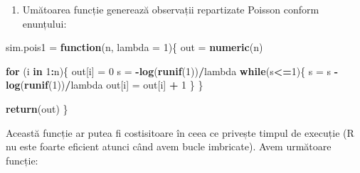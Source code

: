 \documentclass[]{article}
\newenvironment{Shaded}{\begin{snugshade}}{\end{snugshade}}
\newcommand{\ControlFlowTok}[1]{\textcolor[rgb]{0.13,0.29,0.53}{\textbf{#1}}}
\newcommand{\DataTypeTok}[1]{\textcolor[rgb]{0.13,0.29,0.53}{#1}}
\newcommand{\DecValTok}[1]{\textcolor[rgb]{0.00,0.00,0.81}{#1}}
\newcommand{\KeywordTok}[1]{\textcolor[rgb]{0.13,0.29,0.53}{\textbf{#1}}}
\newcommand{\NormalTok}[1]{#1}
\newcommand{\OperatorTok}[1]{\textcolor[rgb]{0.81,0.36,0.00}{\textbf{#1}}}
\newcommand{\StringTok}[1]{\textcolor[rgb]{0.31,0.60,0.02}{#1}}
\providecommand{\tightlist}{%
  \setlength{\itemsep}{0pt}\setlength{\parskip}{0pt}}
\begin{document}
\begin{enumerate}
\def\labelenumi{\arabic{enumi}.}
\setcounter{enumi}{2}
\tightlist
\item
  Umătoarea funcție generează observații repartizate Poisson conform
  enunțului:
\end{enumerate}

\begin{Shaded}
\begin{Highlighting}[]
\NormalTok{sim.pois1 =}\StringTok{ }\ControlFlowTok{function}\NormalTok{(n, }\DataTypeTok{lambda =} \DecValTok{1}\NormalTok{)\{}
\NormalTok{  out =}\StringTok{ }\KeywordTok{numeric}\NormalTok{(n)}
  
  \ControlFlowTok{for}\NormalTok{ (i }\ControlFlowTok{in} \DecValTok{1}\OperatorTok{:}\NormalTok{n)\{}
\NormalTok{    out[i] =}\StringTok{ }\DecValTok{0}
\NormalTok{    s =}\StringTok{ }\OperatorTok{-}\KeywordTok{log}\NormalTok{(}\KeywordTok{runif}\NormalTok{(}\DecValTok{1}\NormalTok{))}\OperatorTok{/}\NormalTok{lambda}
    \ControlFlowTok{while}\NormalTok{(s}\OperatorTok{<=}\DecValTok{1}\NormalTok{)\{}
\NormalTok{      s =}\StringTok{ }\NormalTok{s }\OperatorTok{-}\StringTok{ }\KeywordTok{log}\NormalTok{(}\KeywordTok{runif}\NormalTok{(}\DecValTok{1}\NormalTok{))}\OperatorTok{/}\NormalTok{lambda }
\NormalTok{      out[i] =}\StringTok{ }\NormalTok{out[i] }\OperatorTok{+}\StringTok{ }\DecValTok{1}
\NormalTok{    \}}
\NormalTok{  \}}
  
  \KeywordTok{return}\NormalTok{(out)}
\NormalTok{\}}
\end{Highlighting}
\end{Shaded}

Această funcție ar putea fi costisitoare în ceea ce privește timpul de
execuție (R nu este foarte eficient atunci când avem bucle imbricate).
Avem următoare funcție:
\end{document}
